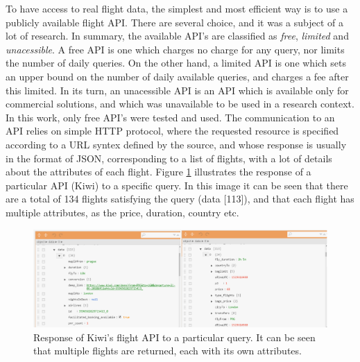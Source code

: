 To have access to real flight data, the simplest and most efficient way is to 
use a publicly available flight API. There are several choice,
and it was a subject of a lot of research.
In summary, the available API's are classified as \textit{free}, \textit{limited} and \textit{unacessible}.
A free API is one which charges no charge for any query, nor limits the number of daily queries.
On the other hand, a limited API is one which sets an upper bound on the number of daily available queries,
and charges a fee after this limited. In its turn, an unacessible API is an API which is available 
only for commercial solutions, and which was unavailable to be used in a research context.
In this work, only free API's were tested and used.
The communication to an API relies on simple HTTP protocol, where the requested resource 
is specified according to a URL syntex defined by the source,
and whose response is usually in the format of JSON, corresponding to a list of flights,
with a lot of details about the attributes of each flight.
Figure \ref{fig:kiwi_response} illustrates the response of a particular API (Kiwi) to a specific query.
In this image it can be seen that there are a total of 134 flights satisfying the query (data [113]),
and that each flight has multiple attributes, as the price, duration, country etc.

\begin{figure}[htpb]
  \centering
  \includegraphics[width=\textwidth]{./Figures/system_design/kiwi_response.png}
  \caption{Response of Kiwi's flight API to a particular query. It can be seen 
  that multiple flights are returned, each with its own attributes.}
  \label{fig:kiwi_response}  
\end{figure}



